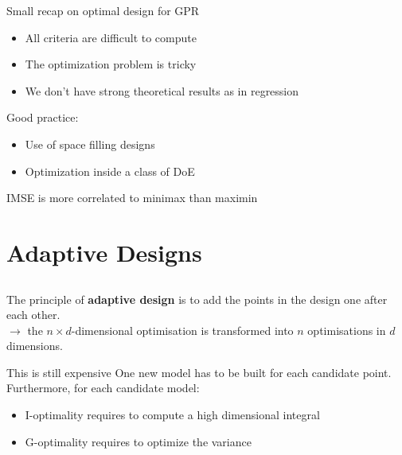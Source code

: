 \documentclass{beamer}
\begin{document}
\begin{frame}{}
Small recap on optimal design for GPR
\begin{itemize}
	\item All criteria are difficult to compute
	\item The optimization problem is tricky
	\item We don't have strong theoretical results as in regression
\end{itemize}
\vspace{3mm}
Good practice:
\begin{itemize}
	\item Use of space filling designs
	\item Optimization inside a class of DoE
\end{itemize}
\vspace{3mm}
 IMSE is more correlated to minimax than maximin
\end{frame}

\section[Adaptive DoE]{Adaptive Designs}
\subsection{}

\begin{frame}{}
The principle of \textbf{adaptive design} is to add the points in the design one after each other.\\
\qquad $\rightarrow$ the $n \times d$-dimensional optimisation is transformed into $n$  optimisations in $d$ dimensions.
\begin{block}{This is still expensive}
One new model has to be built for each candidate point. Furthermore, for each candidate model:
	\begin{itemize}
		\item I-optimality requires to compute a high dimensional integral
		\item G-optimality requires to optimize the variance
	\end{itemize}
\end{block}
\end{frame}
\end{document}
